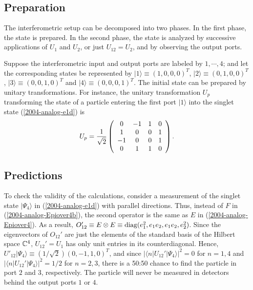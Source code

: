 \documentclass[pra,preprint,showpacs,showkeys,amsfonts]{revtex4}
\begin{document}
\subsection{Preparation}
The interferometric setup can be decomposed into two phases.
In the first phase, the state is prepared.
In the second phase, the state is analyzed by successive applications
of $U_1$ and $U_2$, or just $U_{12}=U_2$, and by observing the output ports.

Suppose the interferometric input and output
ports are labeled by $1,\cdots ,4$; and let the corresponding  states
be represented by
$\vert 1\rangle \equiv (1,0,0,0)^T$,
$\vert 2\rangle \equiv (0,1,0,0)^T$,
$\vert 3\rangle \equiv (0,0,1,0)^T$
and
$\vert 4\rangle \equiv (0,0,0,1)^T$.
The initial state can be prepared by unitary transformations.
For instance, the unitary transformation $U_p$ transforming
the state of a particle entering the first port
$\vert 1\rangle $
into the singlet state
(\ref{2004-analog-e1d})
is
\begin{equation}
U_p = {1\over  \sqrt{2}}
\left(
\begin{array}{cccc}
0& -1& 1& 0\\
1& 0& 0& 1\\
-1& 0& 0& 1    \\
0& 1& 1& 0
\end{array}
\right)
.        \label{2004-analog-eprep2}
\end{equation}

\subsection{Predictions}


To check the validity of the calculations, consider a measurement
of the singlet state $\vert \Psi_4\rangle$ in (\ref{2004-analog-e1d}) with parallel directions.
Thus, instead of $F$ in
(\ref{2004-analog-Epiover4b}),
the second operator is the same as $E$ in
(\ref{2004-analog-Epiover4}).
As a result,
$O_{12}' \equiv E \otimes E \equiv {\rm diag}(e_1^2,e_1e_2,e_1e_2,e_2^2)$.
Since the eigenvectors of $O_{12}'$ are just the elements
of the standard basis of the Hilbert space
${\Bbb C}^4$,
$U_{12}'=U_1$ has only unit entries in its counterdiagonal.
Hence,
$U'_{12}\vert \Psi_4\rangle \equiv (1/\sqrt{2})(0,-1,1,0)^T$,
and since
$\vert \langle n \vert U_{12}'\vert \Psi_4\rangle \vert^2 =0$ for
$n=1,4$ and
$\vert \langle n \vert U_{12}'\vert \Psi_4\rangle \vert^2 =1/2$ for
$n=2,3$,
there is a 50:50 chance to find the particle in port $2$ and $3$,
respectively.
The particle will never be measured in detectors behind the output ports
$1$ or $4$.
\end{document}
